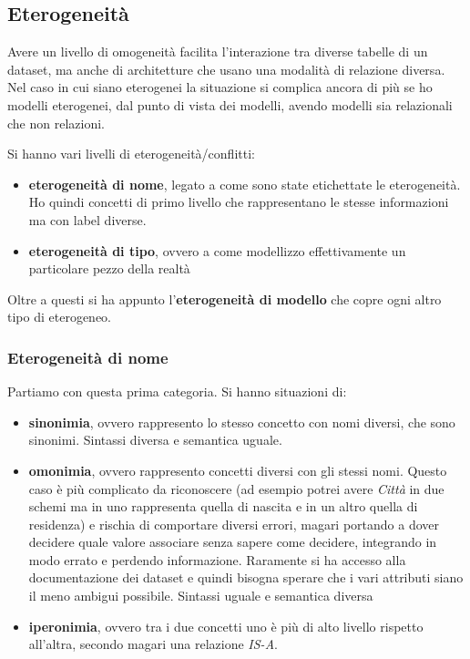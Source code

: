\subsection{Eterogeneità}

Avere un livello di omogeneità facilita l'interazione tra diverse tabelle di un dataset, ma anche di architetture che usano una modalità di relazione diversa. Nel caso in cui siano eterogenei la situazione si complica ancora di più se ho modelli eterogenei, dal punto di vista dei modelli, avendo modelli sia relazionali che non relazioni.

Si hanno vari livelli di eterogeneità/conflitti:
\begin{itemize}
    \item \textbf{eterogeneità di nome}, legato a come sono state etichettate le eterogeneità. Ho quindi concetti di primo livello che rappresentano le stesse informazioni ma con label diverse.
    \item \textbf{eterogeneità di tipo}, ovvero a come modellizzo effettivamente un particolare pezzo della realtà
\end{itemize}
Oltre a questi si ha appunto l'\textbf{eterogeneità di modello} che copre ogni altro tipo di eterogeneo.
\subsubsection{Eterogeneità di nome}
Partiamo con questa prima categoria. Si hanno situazioni di:
\begin{itemize}
    \item \textbf{sinonimia}, ovvero rappresento lo stesso concetto con nomi diversi, che sono sinonimi. Sintassi diversa e semantica uguale.
    \item \textbf{omonimia}, ovvero rappresento concetti diversi con gli stessi nomi. Questo caso è più complicato da riconoscere (ad esempio potrei avere \textit{Città} in due schemi ma in uno rappresenta quella di nascita e in un altro quella di residenza) e rischia di comportare diversi errori, magari portando a dover decidere quale valore associare senza sapere come decidere, integrando in modo errato e perdendo informazione. Raramente si ha accesso alla documentazione dei dataset e quindi bisogna sperare che i vari attributi siano il meno ambigui possibile. Sintassi uguale e semantica diversa
    \item \textbf{iperonimia}, ovvero tra i due concetti uno è più di alto livello rispetto all'altra, secondo magari una relazione \textit{IS-A}.
\end{itemize}
